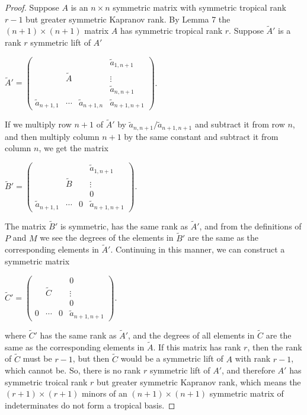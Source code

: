 \documentclass{article}
\begin{document}
\begin{proof}
  Suppose $A$ is an $n \times n$ symmetric matrix with symmetric tropical rank $r-1$ but greater symmetric Kapranov rank. By Lemma 7 the $(n+1) \times (n+1)$ matrix $A$ has symmetric tropical rank $r$. Suppose $\tilde{A}'$ is a rank $r$ symmetric lift of $A'$
  \begin{center}
    $\tilde{A}' = \left(\begin{array}{ccc|c} & & & \tilde{a}_{1,n+1} \\ & \tilde{A} & & \vdots \\ & & & \tilde{a}_{n,n+1} \\ \hline \tilde{a}_{n+1,1} & \cdots & \tilde{a}_{n+1,n} & \tilde{a}_{n+1,n+1} \end{array}\right)$.
  \end{center}
  If we multiply row $n+1$ of $\tilde{A}'$ by $\tilde{a}_{n,n+1}/\tilde{a}_{n+1,n+1}$ and subtract it from row $n$, and then multiply column $n+1$ by the same constant and subtract it from column $n$, we get the matrix
  \begin{center}
    $\tilde{B}' = \left(\begin{array}{ccc|c} & & & \tilde{a}_{1,n+1} \\ & \tilde{B} & & \vdots \\ & & & 0 \\ \hline \tilde{a}_{n+1,1} & \cdots & 0 & \tilde{a}_{n+1,n+1} \end{array}\right)$.
  \end{center}
  The matrix $\tilde{B}'$ is symmetric, has the same rank as $\tilde{A}'$, and from the definitions of $P$ and $M$ we see the degrees of the elements in $\tilde{B}'$ are the same as the corresponding elements in $\tilde{A}'$. Continuing in this manner, we can construct a symmetric matrix
  \begin{center}
    $\tilde{C}' = \left(\begin{array}{ccc|c} & & & 0 \\ & \tilde{C} & & \vdots \\ & & & 0 \\ \hline 0 & \cdots & 0 & \tilde{a}_{n+1,n+1} \end{array}\right)$.
  \end{center}
  where $\tilde{C}'$ has the same rank as $\tilde{A}'$, and the degrees of all elements in $\tilde{C}$ are the same as the corresponding elements in $\tilde{A}$. If this matrix has rank $r$, then the rank of $\tilde{C}$ must be $r-1$, but then $\tilde{C}$ would be a symmetric lift of $A$ with rank $r-1$, which cannot be. So, there is no rank $r$ symmetric lift of $A'$, and therefore $A'$ has symmetric troical rank $r$ but greater symmetric Kapranov rank, which means the $(r+1) \times (r+1)$ minors of an $(n+1) \times (n+1)$ symmetric matrix of indeterminates do not form a tropical basis.
\end{proof}
\end{document}
